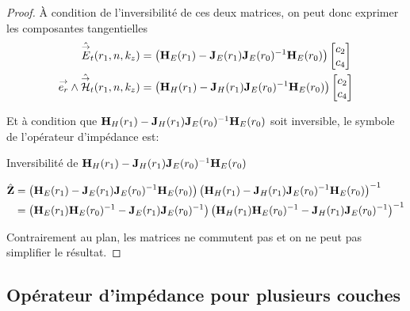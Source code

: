 \begin{proof}
      À condition de l'inversibilité de ces deux matrices, on peut donc exprimer les composantes tangentielles
      \begin{align}
        \hat {{\overset{\rightarrow}{E}}}_t(r_1,n,k_z) &=
        \left(\mathbf{H}_{E}(r_1) - \mathbf{J}_{E}(r_1)\mathbf{J}_{E}(r_0)^{-1}\mathbf{H}_{E}(r_0)\right)
        \begin{bmatrix}
          c_2 \\
          c_4
        \end{bmatrix}
        \\
        {\overset{\rightarrow}{e_r}}\wedge \hat {{\overset{\rightarrow}{\mathcal{H}}}}_t(r_1,n,k_z) &=
        \left(\mathbf{H}_{H}(r_1) - \mathbf{J}_{H}(r_1)\mathbf{J}_{E}(r_0)^{-1}\mathbf{H}_{E}(r_0) \right)
        \begin{bmatrix}
          c_2 \\
          c_4
        \end{bmatrix}
      \end{align}

      Et à condition que \(\mathbf{H}_{H}(r_1) - \mathbf{J}_{H}(r_1)\mathbf{J}_{E}(r_0)^{-1}\mathbf{H}_{E}(r_0)\) soit inversible, le symbole de l'opérateur d'impédance est:
      \begin{TODO}
        Inversibilité de \(\mathbf{H}_{H}(r_1) - \mathbf{J}_{H}(r_1)\mathbf{J}_{E}(r_0)^{-1}\mathbf{H}_{E}(r_0)\)
      \end{TODO}
      \begin{align}
        \hat {\mathbf{Z}} &=
        \left(\mathbf{H}_{E}(r_1) - \mathbf{J}_{E}(r_1)\mathbf{J}_{E}(r_0)^{-1}\mathbf{H}_{E}(r_0)\right)
        \left(\mathbf{H}_{H}(r_1) - \mathbf{J}_{H}(r_1)\mathbf{J}_{E}(r_0)^{-1}\mathbf{H}_{E}(r_0)\right)^{-1}
        \\
        &=
        \left(\mathbf{H}_{E}(r_1)\mathbf{H}_{E}(r_0)^{-1} - \mathbf{J}_{E}(r_1)\mathbf{J}_{E}(r_0)^{-1}\right)
        \left(\mathbf{H}_{H}(r_1)\mathbf{H}_{E}(r_0)^{-1} - \mathbf{J}_{H}(r_1)\mathbf{J}_{E}(r_0)^{-1}\right)^{-1}
      \end{align}

      Contrairement au plan, les matrices ne commutent pas et on ne peut pas simplifier le résultat.

    \end{proof}



  \subsection{Opérateur d'impédance pour plusieurs couches}

